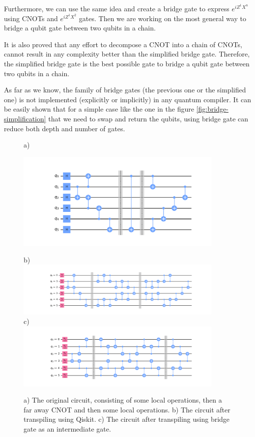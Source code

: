 \documentclass{article}
\begin{document}
  Furthermore, we can use the same idea and create a bridge gate to express $e^{iZ^{1}X^{n}}$ using CNOTs and $e^{iZ^{1}X^{2}}$ gates. Then we are working on the most general way to bridge a qubit gate between two qubits in a chain.

  It is also proved that any effort to decompose a CNOT into a chain of CNOTs, cannot result in any complexity better than the simplified bridge gate. Therefore, the simplified bridge gate is the best possible gate to bridge a qubit gate between two qubits in a chain.

  As far as we know, the family of bridge gates (the previous one or the simplified one) is not implemented (explicitly or implicitly) in any quantum compiler. 
  It can be easily shown that for a simple case like the one in the figure \ref{fig:bridge-simplification} that we need to swap and return the qubits, using bridge gate can reduce both depth and number of gates.

  \begin{figure}
    a) \\
    \begin{center}
    \includegraphics[width=0.9\textwidth]{../../code/expm_1_bridge/out/original_circuit}
    \end{center}
    b) \\
    \includegraphics[width=0.9\textwidth]{../../code/expm_1_bridge/out/transpiled_circuit_swap} \\
    c) \\
    \includegraphics[width=0.9\textwidth]{../../code/expm_1_bridge/out/transpiled_circuit_bridge}
    \caption{a) The original circuit, consisting of some local operations, then a far away CNOT and then some local operations. b) The circuit after transpiling using Qiskit. c) The circuit after transpiling using bridge gate as an intermediate gate.}
  \end{figure}
\end{document}
